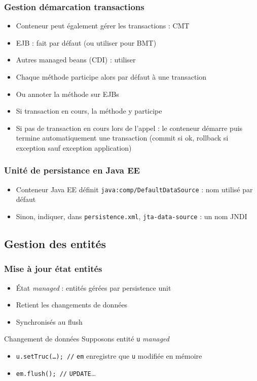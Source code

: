 \documentclass[english, french]{beamer}
\begin{document}
\begin{frame}
	\frametitle{Gestion démarcation transactions}
	\begin{itemize}
		\item Conteneur peut également gérer les transactions : CMT
		\item EJB : fait par défaut {\tiny (ou utiliser  pour BMT)}
		\item Autres managed beans (CDI) : utiliser 
		\item Chaque méthode participe alors par défaut à une transaction
		\item Ou annoter la méthode  sur EJBs
		\item Si transaction en cours, la méthode y participe
		\item Si pas de transaction en cours lors de l’appel : le conteneur démarre puis termine automatiquement une transaction (commit si ok, rollback si exception {\tiny sauf exception application})
	\end{itemize}
\end{frame}

\begin{frame}
	\frametitle{Unité de persistance en Java EE}
	\begin{itemize}
		\item Conteneur Java EE définit \texttt{java:comp/DefaultDataSource} : nom utilisé par défaut
		\item Sinon, indiquer, dans \texttt{persistence.xml}, \texttt{jta-data-source} : un nom JNDI
	\end{itemize}
\end{frame}

\subsection{Gestion des entités}
\begin{frame}
	\frametitle{Mise à jour état entités}
	\begin{itemize}
		\item État \emph{managed} : entités gérées par persistence unit
		\item Retient les changements de données
		\item Synchronisés au flush
	\end{itemize}
	\begin{exampleblock}{Changement de données}
		Supposons entité \texttt{u} \emph{managed}
		\begin{itemize}
			\item \texttt{u.setTruc(…); //} \texttt{em} enregistre que \texttt{u} modifiée en mémoire
			\item \texttt{em.flush(); //} \texttt{UPDATE}…
		\end{itemize}
	\end{exampleblock}
\end{frame}
\end{document}
